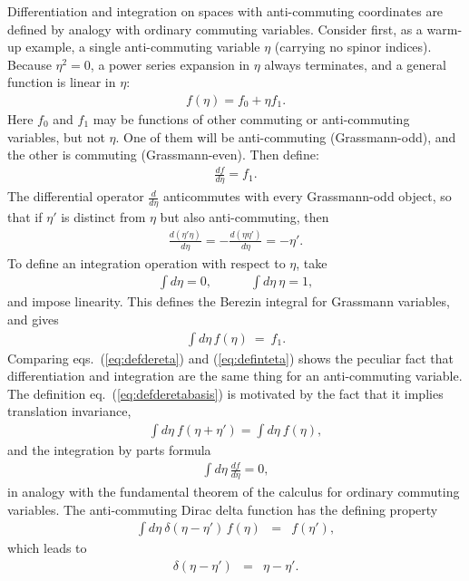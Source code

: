\documentclass[12pt]{article}
\def\beq{\begin{eqnarray}}
\def\eeq{\end{eqnarray}}
\begin{document}
Differentiation and integration on spaces with anti-commuting coordinates are defined 
by analogy with ordinary commuting variables. Consider first, as a warm-up 
example, a single anti-commuting variable 
$\eta$ (carrying no spinor indices). Because $\eta^2=0$, 
a power series expansion in $\eta$ 
always terminates, and a general function is linear in $\eta$:
\beq
f(\eta) = f_0 + \eta f_1.
\label{eq:deffuneta}
\eeq
Here $f_0$ and $f_1$ may be functions of other commuting or 
anti-commuting variables, but not $\eta$. One of them will be  
anti-commuting (Grassmann-odd), and the other is commuting (Grassmann-even). 
Then define:
\beq
\frac{df}{d\eta} = f_1 .
\label{eq:defdereta}
\eeq
The differential operator $\frac{d}{d\eta}$ anticommutes 
with every Grassmann-odd object,
so that if $\eta'$ is distinct from $\eta$ but also anti-commuting, then 
\beq
\frac{d(\eta'\eta)}{d\eta} = -\frac{d(\eta\eta')}{d\eta} = -\eta'.
\eeq
To define an integration operation with respect to $\eta$, take
\beq
\int d\eta = 0, \qquad\quad
\int d\eta\> \eta = 1,
\label{eq:defderetabasis}
\eeq
and impose linearity.
This defines the Berezin integral \cite{Berezin} 
for Grassmann variables, and gives
\beq
\int d\eta \,f(\eta)  
\> = \> f_1 .
\label{eq:definteta}
\eeq
Comparing eqs.~(\ref{eq:defdereta}) and (\ref{eq:definteta}) shows
the peculiar fact that 
differentiation and integration are the same thing
for an anti-commuting variable. 
The definition eq.~(\ref{eq:defderetabasis}) is motivated by the fact that it implies
translation invariance,
\beq
\int d\eta \> f(\eta + \eta') = \int d\eta \> f(\eta),
\eeq
and the integration by parts formula
\beq
\int d\eta \> \frac{df}{d\eta} = 0,
\label{eq:funtheoeta}
\eeq
in analogy with the fundamental theorem of the calculus 
for ordinary commuting variables. 
The anti-commuting Dirac delta function has the defining property
\beq
\int d\eta\> \delta(\eta - \eta')\, f(\eta) &=& f(\eta'),
\eeq
which leads to
\beq
\delta (\eta - \eta') &=& \eta - \eta'.
\eeq
\end{document}
